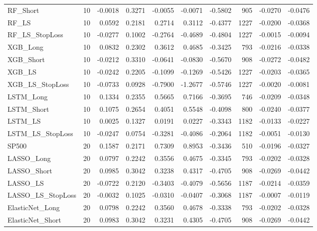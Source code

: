 \begin{tabular}{llrrrrrrrr}
\cline{1-10}
RF\_Short & 10 & -0.0018 & 0.3271 & -0.0055 & -0.0071 & -0.5802 & 905 & -0.0270 & -0.0476 \\
\cline{1-10}
RF\_LS & 10 & 0.0592 & 0.2181 & 0.2714 & 0.3112 & -0.4377 & 1227 & -0.0200 & -0.0368 \\
\cline{1-10}
RF\_LS\_StopLoss & 10 & -0.0277 & 0.1002 & -0.2764 & -0.4689 & -0.4804 & 1227 & -0.0015 & -0.0094 \\
\cline{1-10}
XGB\_Long & 10 & 0.0832 & 0.2302 & 0.3612 & 0.4685 & -0.3425 & 793 & -0.0216 & -0.0338 \\
\cline{1-10}
XGB\_Short & 10 & -0.0212 & 0.3310 & -0.0641 & -0.0830 & -0.5670 & 908 & -0.0272 & -0.0482 \\
\cline{1-10}
XGB\_LS & 10 & -0.0242 & 0.2205 & -0.1099 & -0.1269 & -0.5426 & 1227 & -0.0203 & -0.0365 \\
\cline{1-10}
XGB\_LS\_StopLoss & 10 & -0.0733 & 0.0928 & -0.7900 & -1.2677 & -0.5746 & 1227 & -0.0020 & -0.0081 \\
\cline{1-10}
LSTM\_Long & 10 & 0.1334 & 0.2355 & 0.5665 & 0.7166 & -0.3695 & 746 & -0.0209 & -0.0348 \\
\cline{1-10}
LSTM\_Short & 10 & 0.1075 & 0.2654 & 0.4051 & 0.5548 & -0.4098 & 800 & -0.0240 & -0.0377 \\
\cline{1-10}
LSTM\_LS & 10 & 0.0025 & 0.1327 & 0.0191 & 0.0227 & -0.3343 & 1182 & -0.0133 & -0.0227 \\
\cline{1-10}
LSTM\_LS\_StopLoss & 10 & -0.0247 & 0.0754 & -0.3281 & -0.4086 & -0.2064 & 1182 & -0.0051 & -0.0130 \\
\cline{1-10}
SP500 & 20 & 0.1587 & 0.2171 & 0.7309 & 0.8953 & -0.3436 & 510 & -0.0196 & -0.0327 \\
\cline{1-10}
LASSO\_Long & 20 & 0.0797 & 0.2242 & 0.3556 & 0.4675 & -0.3345 & 793 & -0.0202 & -0.0328 \\
\cline{1-10}
LASSO\_Short & 20 & 0.0985 & 0.3042 & 0.3238 & 0.4317 & -0.4705 & 908 & -0.0269 & -0.0442 \\
\cline{1-10}
LASSO\_LS & 20 & -0.0722 & 0.2120 & -0.3403 & -0.4079 & -0.5656 & 1187 & -0.0214 & -0.0359 \\
\cline{1-10}
LASSO\_LS\_StopLoss & 20 & -0.0032 & 0.1025 & -0.0310 & -0.0407 & -0.3068 & 1187 & -0.0007 & -0.0119 \\
\cline{1-10}
ElasticNet\_Long & 20 & 0.0798 & 0.2242 & 0.3560 & 0.4678 & -0.3338 & 793 & -0.0202 & -0.0328 \\
\cline{1-10}
ElasticNet\_Short & 20 & 0.0983 & 0.3042 & 0.3231 & 0.4305 & -0.4705 & 908 & -0.0269 & -0.0442 \\

\end{tabular}
